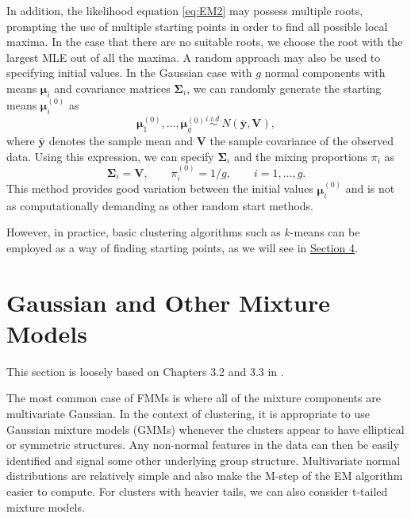 \documentclass{article}\usepackage[]{graphicx}\usepackage[]{xcolor}
\theoremstyle{plain}
\theoremstyle{definition}
\theoremstyle{remark}
\newcommand{\boldy}{\mathbf{y}}
\newcommand{\boldmu}{\boldsymbol{\mu}}
\newcommand{\boldSigma}{\boldsymbol{\Sigma}}
\begin{document}
In addition, the likelihood equation \eqref{eq:EM2} may possess multiple roots, prompting the use of multiple starting points in order to find all possible local maxima. In the case that there are no suitable roots, we choose the root with the largest MLE out of all the maxima.
\newpage
A random approach may also be used to specifying initial values. In the Gaussian case with $g$ normal components with means $\boldmu_i$ and covariance matrices $\boldSigma_i$, we can randomly generate the starting means $\boldmu_i^{(0)}$ as
\begin{equation}
  \boldmu_1^{(0)}, \dots, \boldmu_g^{(0)} \stackrel{i.i.d.}{\sim} N(\bar{\boldy}, \boldsymbol{V}),
\end{equation}
where $\bar{\boldy}$ denotes the sample mean and $\boldsymbol{V}$ the sample covariance of the observed data. Using this expression, we can specify $\boldSigma_i$ and the mixing proportions $\pi_i$ as
\begin{equation}
  \boldSigma_i = \boldsymbol{V}, \qquad \pi_i^{(0)} = 1/g, \qquad i = 1, \dots, g.
\end{equation}
This method provides good variation between the initial values $\boldmu_i^{(0)}$ and is not as computationally demanding as other random start methods.

However, in practice, basic clustering algorithms such as $k$-means can be employed as a way of finding starting points, as we will see in \hyperref[sec:Iris]{Section 4}.


\newpage


\section{Gaussian and Other Mixture Models}\label{sec:GMM}

This section is loosely based on Chapters 3.2 and 3.3 in \cite{FMMs_Book}.

The most common case of FMMs is where all of the mixture components are multivariate Gaussian. In the context of clustering, it is appropriate to use Gaussian mixture models (GMMs) whenever the clusters appear to have elliptical or symmetric structures. Any non-normal features in the data can then be easily identified and signal some other underlying group structure. Multivariate normal distributions are relatively simple and also make the M-step of the EM algorithm easier to compute. For clusters with heavier tails, we can also consider t-tailed mixture models.
\end{document}
